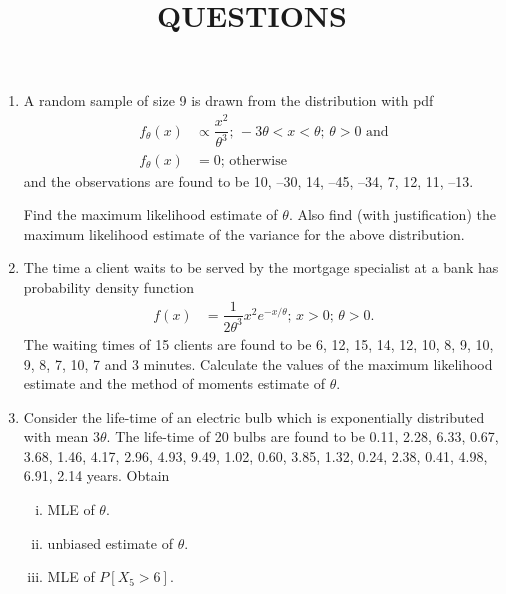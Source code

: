 \documentclass[11pt, a4paper]{article}
\title{\textbf{QUESTIONS}}
\author{}
\date{}
\begin{document}
\maketitle

\begin{enumerate}


	\item A random sample of size 9 is drawn from the distribution with pdf
	\begin{align*}
	f_{\theta}(x) &\propto \dfrac{x^2}{{\theta}^3}; \,  -3\theta < x < \theta; \, \theta > 0 \,\, \text{and} \\
	f_{\theta}(x) &= 0; \, \text{otherwise}
	\end{align*}
	and the observations are found to be 10, –30, 14, –45, –34, 7, 12, 11, –13.

Find the maximum likelihood estimate of $\theta$. Also find (with justification) the maximum likelihood estimate of the variance for the above distribution.





	\item The time a client waits to be served by the mortgage specialist at a bank has probability density function 
	\begin{align*}
	f(x) &= \dfrac{1}{2{\theta}^3} x^2 e^{-x/\theta}; \, x > 0; \, \theta > 0.
	\end{align*}
	The waiting times of 15 clients are found to be 6, 12, 15, 14, 12, 10, 8, 9, 10, 9, 8, 7, 10, 7 and 3 minutes. 
Calculate the values of the maximum likelihood estimate and the method of moments estimate of $\theta$. 










	\item Consider the life-time of an electric bulb which is exponentially distributed with mean $3\theta$. The life-time of 20 bulbs are found to be 0.11, 2.28, 6.33, 0.67, 3.68, 1.46, 4.17, 2.96, 4.93, 9.49, 1.02, 0.60, 3.85, 1.32, 0.24, 2.38, 0.41, 4.98, 6.91, 2.14 years. Obtain 
	\begin{enumerate}[(i)]
		\item MLE of $\theta$.
		\item unbiased estimate of $\theta$.
		\item MLE of $P\left[ X_5 > 6 \right]$.	
	\end{enumerate}
	

\end{enumerate}
\end{document}
